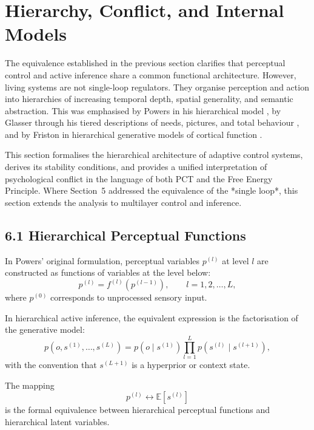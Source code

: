 \documentclass[11pt,a4paper,twoside]{article}
\begin{document}
\newpage


\section{Hierarchy, Conflict, and Internal Models}

The equivalence established in the previous section clarifies that perceptual control
and active inference share a common functional architecture.
However, living systems are not single-loop regulators.
They organise perception and action into hierarchies of increasing temporal depth,
spatial generality, and semantic abstraction.
This was emphasised by Powers in his hierarchical model
\cite{powers1973behavior,powers2005behavior},
by Glasser through his tiered descriptions of needs, pictures, and total behaviour
\cite{glasser1981stations,glasser1998choice},
and by Friston in hierarchical generative models of cortical function
\cite{friston2009free,friston2010free}.

This section formalises the hierarchical architecture of adaptive control systems,
derives its stability conditions, and provides a unified interpretation of psychological
conflict in the language of both PCT and the Free Energy Principle.
Where Section~5 addressed the equivalence of the *single loop*, this section extends the analysis to multilayer control and inference.

\subsection*{6.1 Hierarchical Perceptual Functions}

In Powers’ original formulation, perceptual variables $p^{(l)}$ at level $l$ are constructed as
functions of variables at the level below:
\[
p^{(l)} = f^{(l)}\!\left(p^{(l-1)}\right),
\qquad l = 1,2,\ldots,L,
\]
where $p^{(0)}$ corresponds to unprocessed sensory input.

In hierarchical active inference, the equivalent expression is the factorisation of the generative model:
\[
p(o,s^{(1)},\ldots,s^{(L)})
= p(o \mid s^{(1)})
\prod_{l=1}^{L} p(s^{(l)} \mid s^{(l+1)}),
\]
with the convention that $s^{(L+1)}$ is a hyperprior or context state.

The mapping
\[
p^{(l)} \leftrightarrow \mathbb{E}[s^{(l)}]
\]
is the formal equivalence between hierarchical perceptual functions and hierarchical latent variables.
\end{document}
